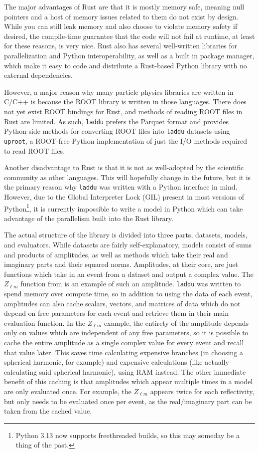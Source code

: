 The major advantages of Rust are that it is mostly memory safe, meaning null pointers and a host of memory issues related to them do not exist by design. While you can still leak memory and also choose to violate memory safety if desired, the compile-time guarantee that the code will not fail at runtime, at least for these reasons, is very nice. Rust also has several well-written libraries for parallelization and Python interoperability, as well as a built in package manager, which make it easy to code and distribute a Rust-based Python library with no external dependencies.

However, a major reason why many particle physics libraries are written in C/C++ is because the ROOT library is written in those languages. There does not yet exist ROOT bindings for Rust, and methods of reading ROOT files in Rust are limited. As such, \texttt{laddu} prefers the Parquet format and provides Python-side methods for converting ROOT files into \texttt{laddu} datasets using \texttt{uproot}, a ROOT-free Python implementation of just the I/O methods required to read ROOT files.

Another disadvantage to Rust is that it is not as well-adopted by the scientific community as other languages. This will hopefully change in the future, but it is the primary reason why \texttt{laddu} was written with a Python interface in mind. However, due to the Global Interpreter Lock (GIL) present in most versions of Python\footnote{Python 3.13 now supports freethreaded builds, so this may someday be a thing of the past.}, it is currently impossible to write a model in Python which can take advantage of the parallelism built into the Rust library.

The actual structure of the library is divided into three parts, datasets, models, and evaluators. While datasets are fairly self-explanatory, models consist of sums and products of amplitudes, as well as methods which take their real and imaginary parts and their squared norms. Amplitudes, at their core, are just functions which take in an event from a dataset and output a complex value. The $Z_{\ell m}$ function from  is an example of such an amplitude. \texttt{laddu} was written to spend memory over compute time, so in addition to using the data of each event, amplitudes can also cache scalars, vectors, and matrices of data which do not depend on free parameters for each event and retrieve them in their main evaluation function. In the $Z_{\ell m}$ example, the entirety of the amplitude depends only on values which are independent of any free parameters, so it is possible to cache the entire amplitude as a single complex value for every event and recall that value later. This saves time calculating expensive branches (in choosing a spherical harmonic, for example) and expensive calculations (like actually calculating said spherical harmonic), using RAM instead. The other immediate benefit of this caching is that amplitudes which appear multiple times in a model are only evaluated once. For example, the $Z_{\ell m}$ appears twice for each reflectivity, but only needs to be evaluated once per event, as the real/imaginary part can be taken from the cached value.

